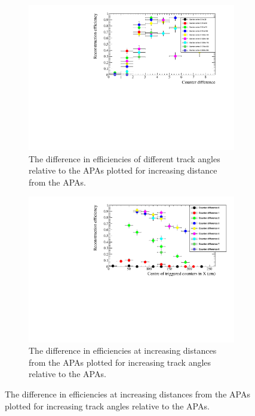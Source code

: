 \begin{figure}[h!]
  \centering
  \begin{subfigure}{0.45\textwidth}
    \centering
    \includegraphics[width=\textwidth]{AngleCanvas_50}
    \caption{The difference in efficiencies of different track angles relative to the APAs plotted for increasing distance from the APAs.}
    \label{fig:AngleCanvas}
  \end{subfigure}
  \hspace{0.08\textwidth}
  \begin{subfigure}{0.45\textwidth}
    \centering
    \includegraphics[width=\textwidth]{DistanceCanvas_50}
    \caption{The difference in efficiencies at increasing distances from the APAs plotted for increasing track angles relative to the APAs.}
    \label{fig:DistanceCanvas}
  \end{subfigure}

\end{figure}
